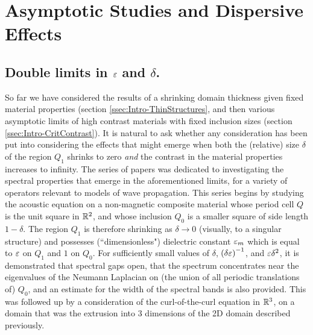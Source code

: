 \section{Asymptotic Studies and Dispersive Effects} 





\subsection{Double limits in $\varepsilon$ and $\delta$.} \label{ssec:Intro-DoubleLimits}
So far we have considered the results of a shrinking domain thickness given fixed material properties (section \ref{ssec:Intro-ThinStructures}, and then various asymptotic limits of high contrast materials with fixed inclusion sizes (section \ref{ssec:Intro-CritContrast}). 
It is natural to ask whether any consideration has been put into considering the effects that might emerge when both the (relative) size $\delta$ of the region $Q_1$ shrinks to zero \emph{and} the contrast in the material properties increases to infinity.
The series of papers \cite{figotin1996band-scalar, figotin1996band-maxwell, figotin1998spectral} was dedicated to investigating the spectral properties that emerge in the aforementioned limits, for a variety of operators relevant to models of wave propagation.
This series begins \cite{figotin1996band-scalar} by studying the acoustic equation on a non-magnetic composite material whose period cell $Q$ is the unit square in $\mathbb{R}^2$, and whose inclusion $Q_0$ is a smaller square of side length $1-\delta$.
The region $Q_1$ is therefore shrinking as $\delta\rightarrow0$ (visually, to a singular structure) and possesses (``dimensionless") dielectric constant $\varepsilon_m$ which is equal to $\varepsilon$ on $Q_1$ and $1$ on $Q_0$.
For sufficiently small values of $\delta$, $\left( \delta\varepsilon \right)^{-1}$, and $\varepsilon\delta^2$, it is demonstrated that spectral gaps open, that the spectrum concentrates near the eigenvalues of the Neumann Laplacian on (the union of all periodic translations of) $Q_0$, and an estimate for the width of the spectral bands is also provided.
This was followed up \cite{figotin1996band-maxwell} by a consideration of the curl-of-the-curl equation in $\mathbb{R}^3$, on a domain that was the extrusion into 3 dimensions of the 2D domain described previously.
